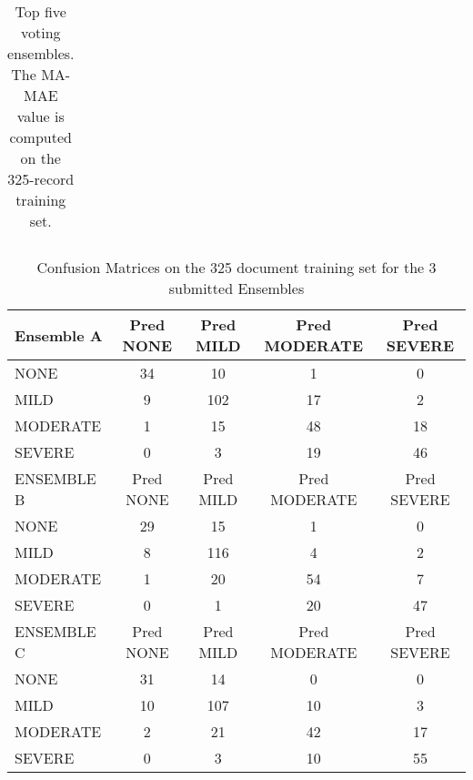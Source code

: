 \begin{table}
\begin{tabular}{|cllc|}
    \end{tabular}
    \caption{Top five voting ensembles. The \textsf{MA-MAE} value
    is computed on the 325-record training set.}
    \label{tab:ourEnsembles}
\end{table}





\begin{table}
\centering
    \begin{tabular}{|l|c|c|c|c|}
   \hline
   \textsf{ \cellcolor{gray!15} Ensemble A } & \textsf{ Pred NONE } & \textsf{ Pred MILD } & \textsf{ Pred MODERATE } & \textsf{ Pred SEVERE } \\ 
    \hline
    \textsf{ NONE } & \cellcolor{gray!15} 34 & 10 & 1 & 0 \\ 
    \textsf{ MILD } & 9 & \cellcolor{gray!15} 102 & 17 & 2 \\ 
    \textsf{ MODERATE } & 1 & 15 & \cellcolor{gray!15} 48 & 18 \\ 
    \textsf{ SEVERE } & 0 & 3 & 19 & \cellcolor{gray!15} 46 \\ 
   \hline
   \textsf{ \cellcolor{gray!15} ENSEMBLE B } & \textsf{ Pred NONE } & \textsf{ Pred MILD } & \textsf{ Pred MODERATE } & \textsf{ Pred SEVERE } \\ 
    \hline
    \textsf{ NONE } & \cellcolor{gray!15} 29 & 15 & 1 & 0 \\ 
    \textsf{ MILD } & 8 & \cellcolor{gray!15} 116 & 4 & 2 \\ 
    \textsf{ MODERATE } & 1 & 20 & \cellcolor{gray!15} 54 & 7 \\ 
    \textsf{ SEVERE } & 0 & 1 & 20 & \cellcolor{gray!15} 47 \\ 
   \hline
   \textsf{ \cellcolor{gray!15} ENSEMBLE C } & \textsf{ Pred NONE } & \textsf{ Pred MILD } & \textsf{ Pred MODERATE } & \textsf{ Pred SEVERE } \\ 
    \hline
    \textsf{ NONE } & \cellcolor{gray!15} 31 & 14 & 0 & 0 \\ 
    \textsf{ MILD } & 10 & \cellcolor{gray!15} 107 & 10 & 3 \\ 
    \textsf{ MODERATE } & 2 & 21 & \cellcolor{gray!15} 42 & 17 \\ 
    \textsf{ SEVERE } & 0 & 3 & 10 & \cellcolor{gray!15} 55 \\ 
    \hline
    \end{tabular}    
    \caption{Confusion Matrices on the 325 document training set for the 3 submitted Ensembles}
    \label{tab:EnsembleTrainConfusionMatrix}
\end{table}

